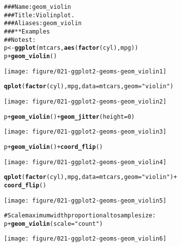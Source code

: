 \documentclass[a4paper,titlepage]{tufte-handout}\usepackage{graphicx, color}
\makeatletter
\def\maxwidth{ %
  \ifdim\Gin@nat@width>\linewidth
    \linewidth
  \else
    \Gin@nat@width
  \fi
}
\newcommand{\hlfunctioncall}[1]{\textcolor[rgb]{0.501960784313725,0,0.329411764705882}{\textbf{#1}}}%
\newcommand{\hlstring}[1]{\textcolor[rgb]{0.6,0.6,1}{#1}}%
\newcommand{\hlcomment}[1]{\textcolor[rgb]{0.180392156862745,0.6,0.341176470588235}{#1}}%
\newenvironment{kframe}{%
 \def\at@end@of@kframe{}%
 \ifinner\ifhmode%
  \def\at@end@of@kframe{\end{minipage}}%
  \begin{minipage}{\columnwidth}%
 \fi\fi%
 \def\FrameCommand##1{\hskip\@totalleftmargin \hskip-\fboxsep
 \colorbox{shadecolor}{##1}\hskip-\fboxsep
     \hskip-\linewidth \hskip-\@totalleftmargin \hskip\columnwidth}%
 \MakeFramed {\advance\hsize-\width
   \@totalleftmargin\z@ \linewidth\hsize
   \@setminipage}}%
 {\par\unskip\endMakeFramed%
 \at@end@of@kframe}
\newenvironment{knitrout}{}{} %
\makeatother
\begin{document}
\begin{knitrout}
\color{fgcolor}\begin{kframe}
\begin{alltt}
\hlcomment{### Name: geom_violin}
\hlcomment{### Title: Violin plot.}
\hlcomment{### Aliases: geom_violin}
\hlcomment{### ** Examples}
\hlcomment{## No test: }
p <- \hlfunctioncall{ggplot}(mtcars, \hlfunctioncall{aes}(\hlfunctioncall{factor}(cyl), mpg))
p + \hlfunctioncall{geom_violin}()
\end{alltt}
\end{kframe}\texttt{[image: figure/021-ggplot2-geoms-geom\_violin1]} \begin{kframe}\begin{alltt}
\hlfunctioncall{qplot}(\hlfunctioncall{factor}(cyl), mpg, data = mtcars, geom = \hlstring{"violin"})
\end{alltt}
\end{kframe}\texttt{[image: figure/021-ggplot2-geoms-geom\_violin2]} \begin{kframe}\begin{alltt}
p + \hlfunctioncall{geom_violin}() + \hlfunctioncall{geom_jitter}(height = 0)
\end{alltt}
\end{kframe}\texttt{[image: figure/021-ggplot2-geoms-geom\_violin3]} \begin{kframe}\begin{alltt}
p + \hlfunctioncall{geom_violin}() + \hlfunctioncall{coord_flip}()
\end{alltt}
\end{kframe}\texttt{[image: figure/021-ggplot2-geoms-geom\_violin4]} \begin{kframe}\begin{alltt}
\hlfunctioncall{qplot}(\hlfunctioncall{factor}(cyl), mpg, data = mtcars, geom = \hlstring{"violin"}) +
  \hlfunctioncall{coord_flip}()
\end{alltt}
\end{kframe}\texttt{[image: figure/021-ggplot2-geoms-geom\_violin5]} \begin{kframe}\begin{alltt}
\hlcomment{# Scale maximum width proportional to sample size:}
p + \hlfunctioncall{geom_violin}(scale = \hlstring{"count"})
\end{alltt}
\end{kframe}\texttt{[image: figure/021-ggplot2-geoms-geom\_violin6]} \begin{kframe}\begin{alltt}

\end{alltt}
\end{kframe}
\end{knitrout}
\end{document}
